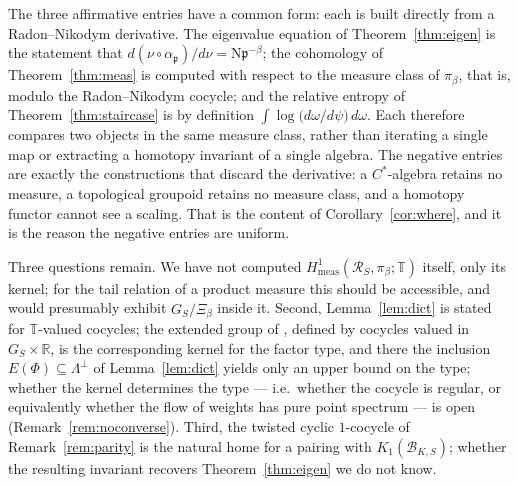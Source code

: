 \documentclass[11pt]{amsart}
\numberwithin{equation}{section}
\theoremstyle{definition}
\theoremstyle{remark}
\newcommand{\R}{\mathbb{R}}
\newcommand{\T}{\mathbb{T}}
\newcommand{\cB}{\mathcal{B}}
\newcommand{\cR}{\mathcal{R}}
\newcommand{\pp}{\mathfrak{p}}
\newcommand{\Ns}{\mathrm{N}}
\begin{document}
The three affirmative entries have a common form: each is built directly from a
Radon--Nikodym derivative. The eigenvalue equation of Theorem~\ref{thm:eigen} is the
statement that $d(\nu\circ\alpha_\pp)/d\nu=\Ns\pp^{-\beta}$; the cohomology of
Theorem~\ref{thm:meas} is computed with respect to the measure class of $\pi_\beta$, that is,
modulo the Radon--Nikodym cocycle; and the relative entropy of
Theorem~\ref{thm:staircase} is by definition
$\int\log\bigl(d\omega/d\psi\bigr)\,d\omega$. Each therefore compares two objects in the
same measure class, rather than iterating a single map or extracting a homotopy invariant of
a single algebra. The negative entries are exactly the constructions that discard the
derivative: a $C^*$-algebra retains no measure, a topological groupoid retains no measure
class, and a homotopy functor cannot see a scaling. That is the content of Corollary~\ref{cor:where}, and it is the reason the
negative entries are uniform.

Three questions remain. We have not computed $H^1_{\mathrm{meas}}(\cR_S,\pi_\beta;\T)$
itself, only its kernel; for the tail relation of a product measure this should be
accessible, and would presumably exhibit $\widehat{G_S}/\Xi_\beta$ inside it. Second,
Lemma~\ref{lem:dict} is stated for $\T$-valued cocycles; the extended group of
\cite{SeriesI}, defined by cocycles valued in $G_S\times\R$, is the corresponding kernel for
the factor type, and there the inclusion $E(\Phi)\subseteq\Lambda^\perp$ of
Lemma~\ref{lem:dict} yields only an upper bound on the type; whether the kernel determines
the type --- i.e.\ whether the cocycle is regular, or equivalently whether the flow of weights
has pure point spectrum --- is open (Remark~\ref{rem:noconverse}). Third, the twisted cyclic $1$-cocycle
of Remark~\ref{rem:parity} is the natural home for a pairing with $K_1(\cB_{K,S})$; whether
the resulting invariant recovers Theorem~\ref{thm:eigen} we do not know.
\end{document}
